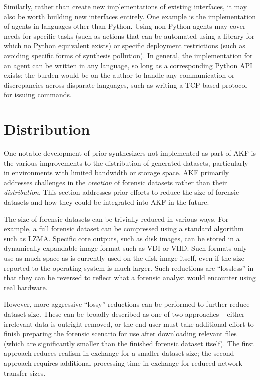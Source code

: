 \documentclass[letterpaper,12pt]{report}
\begin{document}
Similarly, rather than create new implementations of existing
interfaces, it may also be worth building new interfaces entirely. One
example is the implementation of agents in languages other than Python.
Using non-Python agents may cover needs for specific tasks (such as
actions that can be automated using a library for which no Python
equivalent exists) or specific deployment restrictions (such as avoiding
specific forms of synthesis pollution). In general, the implementation
for an agent can be written in any language, so long as a corresponding
Python API exists; the burden would be on the author to handle any
communication or discrepancies across disparate languages, such as
writing a TCP-based protocol for issuing commands.

\section{Distribution}\label{distribution}

One notable development of prior synthesizers not implemented as part of
AKF is the various improvements to the distribution of generated
datasets, particularly in environments with limited bandwidth or storage
space. AKF primarily addresses challenges in the \emph{creation} of
forensic datasets rather than their \emph{distribution}. This section
addresses prior efforts to reduce the size of forensic datasets and how
they could be integrated into AKF in the future.

The size of forensic datasets can be trivially reduced in various ways.
For example, a full forensic dataset can be compressed using a standard
algorithm such as LZMA. Specific core outputs, such as disk images, can
be stored in a dynamically expandable image format such as VDI or VHD.
Such formats only use as much space as is currently used on the disk
image itself, even if the size reported to the operating system is much
larger. Such reductions are ``lossless'' in that they can be reversed to
reflect what a forensic analyst would encounter using real hardware.

However, more aggressive ``lossy'' reductions can be performed to
further reduce dataset size. These can be broadly described as one of
two approaches -- either irrelevant data is outright removed, or the end
user must take additional effort to finish preparing the forensic
scenario for use after downloading relevant files (which are
significantly smaller than the finished forensic dataset itself). The
first approach reduces realism in exchange for a smaller dataset size;
the second approach requires additional processing time in exchange for
reduced network transfer sizes.
\end{document}
